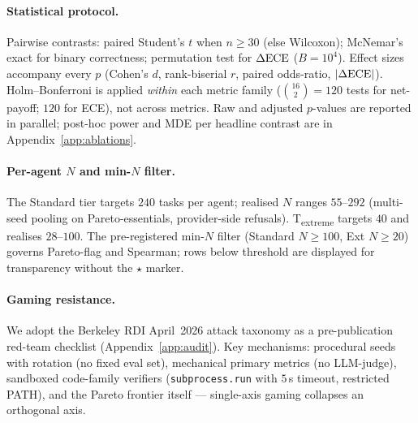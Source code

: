 \paragraph{Statistical protocol.}\label{sec:stats}
Pairwise contrasts: paired Student's $t$ when $n \ge 30$ (else
Wilcoxon); McNemar's exact for binary correctness; permutation test for
$\Delta\mathrm{ECE}$ ($B = 10^4$). Effect sizes accompany every $p$ (Cohen's
$d$, rank-biserial $r$, paired odds-ratio, $|\Delta\mathrm{ECE}|$).
Holm--Bonferroni is applied \emph{within} each metric family
($\binom{16}{2} = 120$ tests for net-payoff; $120$ for ECE), not
across metrics. Raw and adjusted $p$-values are reported in parallel;
post-hoc power and MDE per headline contrast are in
Appendix~\ref{app:ablations}.

\paragraph{Per-agent $N$ and min-$N$ filter.}
The Standard tier targets $240$ tasks per agent; realised $N$ ranges
$55$--$292$ (multi-seed pooling on Pareto-essentials, provider-side
refusals). T\textsubscript{extreme} targets $40$ and realises
$28$--$100$. The pre-registered min-$N$ filter (Standard $N \ge 100$,
Ext $N \ge 20$) governs Pareto-flag and Spearman; rows below threshold
are displayed for transparency without the $\star$ marker.

\paragraph{Gaming resistance.}\label{sec:gaming}
We adopt the Berkeley RDI April~2026 attack taxonomy as a
pre-publication red-team checklist (Appendix~\ref{app:audit}). Key
mechanisms: procedural seeds with rotation (no fixed eval set),
mechanical primary metrics (no LLM-judge), sandboxed code-family
verifiers (\texttt{subprocess.run} with $5$\,s timeout, restricted
PATH), and the Pareto frontier itself --- single-axis gaming collapses
an orthogonal axis.
